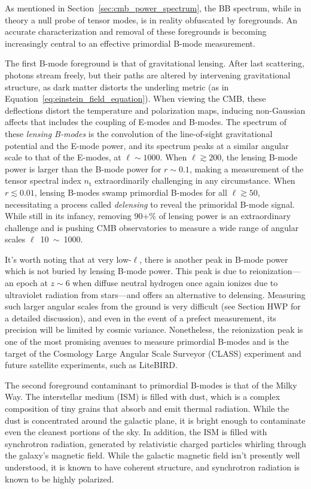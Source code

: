 As mentioned in Section~\ref{sec:cmb_power_spectrum}, the BB spectrum, while in theory a null probe of tensor modes, is in reality obfuscated by foregrounds. An accurate characterization and removal of these foregrounds is becoming increasingly central to an effective primordial B-mode measurement.

The first B-mode foreground is that of gravitational lensing. After last scattering, photons stream freely, but their paths are altered by intervening gravitational structure, as dark matter distorts the underling metric (as in Equation~\ref{eq:einstein_field_equation}). When viewing the CMB, these deflections distort the temperature and polarization maps, inducing non-Gaussian affects that includes the coupling of E-modes and B-modes. The spectrum of these \textit{lensing B-modes} is the convolution of the line-of-sight gravitational potential and the E-mode power, and its spectrum peaks at a similar angular scale to that of the E-modes, at $\ell \sim 1000$. When $\ell \gtrsim 200$, the lensing B-mode power is larger than the B-mode power for $r \sim 0.1$, making a measurement of the tensor spectral index $n_{\mathrm{t}}$ extraordinarily challenging in any circumstance. When $r \lesssim 0.01$, lensing B-modes swamp primordial B-modes for all $\ell \gtrsim 50$, necessitating a process called \textit{delensing} to reveal the primoridal B-mode signal. While still in its infancy, removing 90+\% of lensing power is an extraordinary challenge and is pushing CMB observatories to measure a wide range of angular scales $\ell$~10~$\sim$~1000.

It's worth noting that at very low-$\ell$, there is another peak in B-mode power which is not buried by lensing B-mode power. This peak is due to reionization---an epoch at $z \sim 6$ when diffuse neutral hydrogen once again ionizes due to ultraviolet radiation from stars---and offers an alternative to delensing. Measuring such larger angular scales from the ground is very difficult (see Section HWP for a detailed discussion), and even in the event of a prefect measurement, its precision will be limited by cosmic variance. Nonetheless, the reionization peak is one of the most promising avenues to measure primordial B-modes and is the target of the Cosmology Large Angular Scale Surveyor (CLASS) experiment and future satellite experiments, such as LiteBIRD. 

The second foreground contaminant to primordial B-modes is that of the Milky Way. The interstellar medium (ISM) is filled with dust, which is a complex composition of tiny grains that absorb and emit thermal radiation. While the dust is concentrated around the galactic plane, it is bright enough to contaminate even the cleanest portions of the sky. In addition, the ISM is filled with synchrotron radiation, generated by relativistic charged particles whirling through the galaxy's magnetic field. While the galactic magnetic field isn't presently well understood, it is known to have coherent structure, and synchrotron radiation is known to be highly polarized. 

